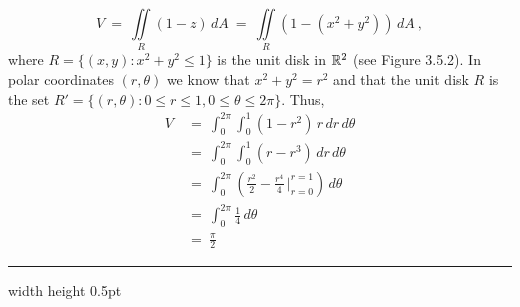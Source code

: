\begin{exmp}
\begin{displaymath}
  V ~=~ \iint\limits_{R} (1 - z)\,dA ~=~ \iint\limits_{R} (1 - (x^2 + y^2 ))\,dA ~,
 \end{displaymath}
 where $R = \lbrace (x,y): x^2 + y^2 \le 1 \rbrace$ is the unit disk in $\mathbb{R}^{2}$
 (see Figure 3.5.2). In polar coordinates $(r,\theta)$
 we know that $x^2 + y^2 = r^2$ and that the unit disk $R$ is the set $R' = \lbrace (r,\theta):0 \le r \le 1, 0 \le
 \theta \le 2\pi \rbrace$. Thus,
 \begin{align*}
  V ~&=~ \int_0^{2\pi} \int_0^1 (1 - r^2 )\,r\,dr\,d\theta\\
   &=~ \int_0^{2\pi} \int_0^1 (r - r^3 )\,dr\,d\theta\\
   &=~ \int_0^{2\pi} \left( \tfrac{r^2}{2} - \tfrac{r^4}{4} \,\Big|_{r=0}^{r=1} \right) \,d\theta\\
   &=~ \int_0^{2\pi} \tfrac{1}{4} \,d\theta\\
   &=~ \frac{\pi}{2}
 \end{align*}
\end{exmp}
\hrule width \textwidth height 0.5pt
\newpage
